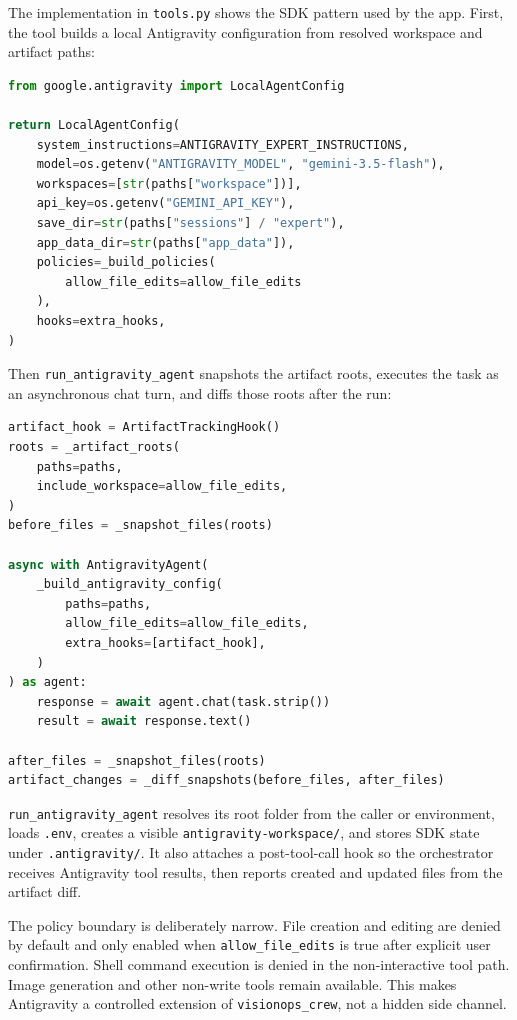 \documentclass[11pt,a4paper]{article}
\begin{document}
The implementation in \texttt{tools.py} shows the SDK pattern used by the app. First, the tool builds a local Antigravity configuration from resolved workspace and artifact paths:

\begin{lstlisting}[language=Python, caption={Creating the local Antigravity SDK configuration in \texttt{tools.py}.}, label={lst:antigravity_config}]
from google.antigravity import LocalAgentConfig

return LocalAgentConfig(
    system_instructions=ANTIGRAVITY_EXPERT_INSTRUCTIONS,
    model=os.getenv("ANTIGRAVITY_MODEL", "gemini-3.5-flash"),
    workspaces=[str(paths["workspace"])],
    api_key=os.getenv("GEMINI_API_KEY"),
    save_dir=str(paths["sessions"] / "expert"),
    app_data_dir=str(paths["app_data"]),
    policies=_build_policies(
        allow_file_edits=allow_file_edits
    ),
    hooks=extra_hooks,
)
\end{lstlisting}

\clearpage

Then \texttt{run\_antigravity\_agent} snapshots the artifact roots, executes the task as an asynchronous chat turn, and diffs those roots after the run:

\begin{lstlisting}[language=Python, caption={Running Antigravity from the orchestrator tool.}, label={lst:antigravity_run}]
artifact_hook = ArtifactTrackingHook()
roots = _artifact_roots(
    paths=paths,
    include_workspace=allow_file_edits,
)
before_files = _snapshot_files(roots)

async with AntigravityAgent(
    _build_antigravity_config(
        paths=paths,
        allow_file_edits=allow_file_edits,
        extra_hooks=[artifact_hook],
    )
) as agent:
    response = await agent.chat(task.strip())
    result = await response.text()

after_files = _snapshot_files(roots)
artifact_changes = _diff_snapshots(before_files, after_files)
\end{lstlisting}

\texttt{run\_antigravity\_agent} resolves its root folder from the caller or environment, loads \texttt{.env}, creates a visible \texttt{antigravity-workspace/}, and stores SDK state under \texttt{.antigravity/}. It also attaches a post-tool-call hook so the orchestrator receives Antigravity tool results, then reports created and updated files from the artifact diff.

The policy boundary is deliberately narrow. File creation and editing are denied by default and only enabled when \texttt{allow\_file\_edits} is true after explicit user confirmation. Shell command execution is denied in the non-interactive tool path. Image generation and other non-write tools remain available. This makes Antigravity a controlled extension of \texttt{visionops\_crew}, not a hidden side channel.
\end{document}
